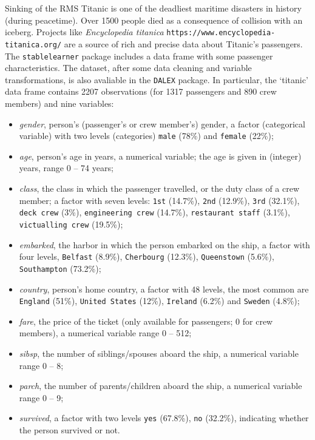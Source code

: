 \documentclass[12pt,]{krantz}
\providecommand{\tightlist}{%
  \setlength{\itemsep}{0pt}\setlength{\parskip}{0pt}}
\begin{document}
Sinking of the RMS Titanic is one of the deadliest maritime disasters in history (during peacetime). Over 1500 people died as a consequence of collision with an iceberg. Projects like \emph{Encyclopedia titanica} \texttt{https://www.encyclopedia-titanica.org/} are a source of rich and precise data about Titanic's passengers.
The \texttt{stablelearner} package includes a data frame with some passenger characteristics.
The dataset, after some data cleaning and variable transformations, is also avaliable in the \texttt{DALEX} package. In particular, the `titanic' data frame contains 2207 observations (for 1317 passengers and 890 crew members) and nine variables:

\begin{itemize}
\tightlist
\item
  \emph{gender}, person's (passenger's or crew member's) gender, a factor (categorical variable) with two levels (categories) \texttt{male} (78\%) and \texttt{female} (22\%);
\item
  \emph{age}, person's age in years, a numerical variable; the age is given in (integer) years, range 0 -- 74 years;
\item
  \emph{class}, the class in which the passenger travelled, or the duty class of a crew member; a factor with seven levels: \texttt{1st} (14.7\%), \texttt{2nd} (12.9\%), \texttt{3rd} (32.1\%), \texttt{deck\ crew} (3\%), \texttt{engineering\ crew} (14.7\%), \texttt{restaurant\ staff} (3.1\%), \texttt{victualling\ crew} (19.5\%);
\item
  \emph{embarked}, the harbor in which the person embarked on the ship, a factor with four levels, \texttt{Belfast} (8.9\%), \texttt{Cherbourg} (12.3\%), \texttt{Queenstown} (5.6\%), \texttt{Southampton} (73.2\%);
\item
  \emph{country}, person's home country, a factor with 48 levels, the most common are \texttt{England} (51\%), \texttt{United\ States} (12\%), \texttt{Ireland} (6.2\%) and \texttt{Sweden} (4.8\%);
\item
  \emph{fare}, the price of the ticket (only available for passengers; 0 for crew members), a numerical variable range 0 -- 512;
\item
  \emph{sibsp}, the number of siblings/spouses aboard the ship, a numerical variable range 0 -- 8;
\item
  \emph{parch}, the number of parents/children aboard the ship, a numerical variable range 0 -- 9;
\item
  \emph{survived}, a factor with two levels \texttt{yes} (67.8\%), \texttt{no} (32.2\%), indicating whether the person survived or not.
\end{itemize}
\end{document}
